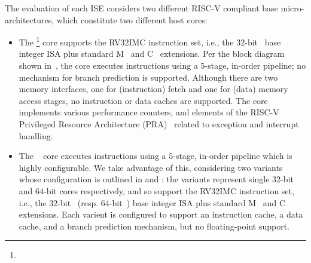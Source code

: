 
The evaluation of each ISE considers two different RISC-V compliant base
micro-architectures, which constitute two different host cores:

\begin{itemize}
\item The \footnote{%
      } core 
      supports the 
      RV32IMC 
      instruction set, i.e.,
      the 
             $32$-bit~\cite[Section 2]{RV:ISA:I:19} 
      base integer ISA plus 
      standard 
      M~\cite[Section  7]{RV:ISA:I:19}
      and
      C~\cite[Section 16]{RV:ISA:I:19}
      extensions.
      Per the block diagram shown in~,
      the core 
      executes instructions using a $5$-stage, in-order pipeline;
      no mechanism for
      branch prediction
      is supported.
      Although there are two memory interfaces, one for (instruction) fetch and one for (data) memory access stages,
      no
      instruction or data caches 
      are supported.
      The core implements various performance counters,
      and
      elements of the
      RISC-V Privileged Resource Architecture (PRA)~\cite[Chapter 3]{RV:ISA:II:17}
      related to exception and interrupt handling.

\item The ~\cite{rocket:16} 
        core
      executes instructions using a $5$-stage, in-order pipeline
      which is highly configurable.
      We take advantage of this, considering two variants whose configuration
      is outlined in
      and 
      :
      the variants represent single $32$-bit and $64$-bit cores respectively,
      and so
      support  the 
      RV32IMC 
      instruction set, i.e.,
      the 
             $32$-bit~\cite[Section 2]{RV:ISA:I:19} 
      (resp. $64$-bit~\cite[Section 5]{RV:ISA:I:19})
      base integer ISA plus 
      standard 
      M~\cite[Section  7]{RV:ISA:I:19}
      and
      C~\cite[Section 16]{RV:ISA:I:19}
      extensions.
      Each varient is configured to support
      an instruction cache, 
      a  data        cache,
      and
      a  branch prediction mechanism,
      but 
      no floating-point support.

\end{itemize}

